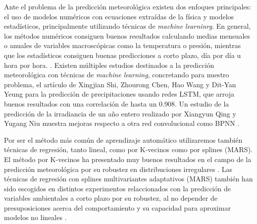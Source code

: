 \documentclass[journal]{IEEEtran}
\begin{document}
Ante el problema de la predicción meteorológica existen dos enfoques principales: el uso de modelos numéricos con ecuaciones extraídas de la física y modelos estadísticos, principalmente utilizando técnicas de \emph{machine learninrg}. \cite{FOLEY20121} En general, los métodos numéricos consiguen buenos resultados calculando medias mensuales o anuales de variables macroscópicas como la temperatura o presión, mientras que los estadísticos consiguen buenas predicciones a corto plazo, día por día u hora por hora. \cite{FOLEY20121} \cite{GIEBEL2003}.
Existen múltiples estudios destinados a la predicción meteorológica con técnicas de \emph{machine learning}, concretando para nuestro problema, el artículo de Xingjian Shi, Zhourong Chen, Hao Wang y Dit-Yan Yeung  para la predicción de precipitaciones usando redes LSTM\cite{NIPS2015_5955}, que arroja buenos resultados con una correlación de hasta un 0.908. Un estudio de la predicción de la irradiancia de un año entero realizado por Xiangyun Qing y Yugang Niu muestra mejoras respecto a otra red convolucional como BPNN \cite{QING2018461}.

Por ser el método más común de aprendizaje automático utilizaremos también técnicas de regresión, tanto lineal, como por K-vecinos como por splines (MARS). El método por K-vecinos ha presentado muy buenos resultados en el campo de la predicción meteorológica por su robustez en distribuciones irregulares \cite{HUANG201789}. Las técnicas de regresión con splines multivariantes adaptativos (MARS) también han sido escogidos en distintos experimentos relaccionados con la predicción de variables ambientales a corto plazo por su robustez, al no depender de presuposiciones acerca del comportamiento y su capacidad para aproximar modelos no lineales \cite{KRZEMIEN2019777} \cite{PA_LEWIS1991_864}.
\end{document}
